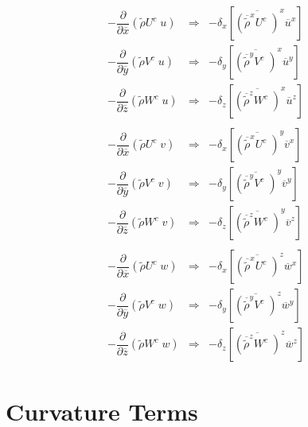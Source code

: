\begin{eqnarray}
- \dfrac{\partial }{\partial \overline{x}} (\tilde{\rho} U^{c} \;   u )
 & \Longrightarrow & - \delta_{x} \left[
\overline{  \left(
\overline{\tilde{\rho}}^{x} U^{c} \;  \right)}^{x}
\overline{  u  }^{x}
 \right]
  \\
  -  \dfrac{\partial }{\partial \overline{y}} (\tilde{\rho} V^{c} \;   u )
 & \Longrightarrow & - \delta_{y} \left[
\overline{  \left(
\overline{ \tilde{\rho}}^{y} V^{c} \; \right)}^{x} \overline{  u }^{y}
  \right]
\\
 -  \dfrac{\partial }{\partial \overline{z}} (\tilde{\rho} W^{c} \;   u )
 & \Longrightarrow & - \delta _{z} \left[ \overline{  \left(
\overline{\tilde{\rho}}^{z} W^{c} \;  \right)}^{x}
 \overline{ u }^{z}
 \right] \\ \nonumber \\
  -  \dfrac{\partial }{\partial \overline{x}} (\tilde{\rho} U^{c} \;   v )
& \Longrightarrow & - \delta_{x} \left[\overline{  \left(
\overline{\tilde{\rho}}^{x} U^{c} \; \right)}^{y} \overline{  v }^{x}
 \right]
\\
- \dfrac{\partial }{\partial \overline{y}} (\tilde{\rho} V^{c} \;   v )
& \Longrightarrow & - \delta_{y} \left[\overline{  \left(
\overline{ \tilde{\rho}}^{y} V^{c} \; \right)}^{y} \overline{   v }^{y}
\right] \\
   - \dfrac{\partial }{\partial \overline{z}} (\tilde{\rho} W^{c} \;   v )
& \Longrightarrow &  - \delta_{z} \left[ \overline{  \left(
\overline{ \tilde{\rho}}^{z} W^{c} \;  \right)}^{y} \overline{  v }^{z}
\right]  \\ \nonumber \\
  -  \dfrac{\partial }{\partial \overline{x}} (\tilde{\rho} U^{c} \;  w)
& \Longrightarrow &  - \delta_{x} \left[\overline{  \left(
\overline{ \tilde{\rho}}^{x}
 U^{c} \; \right)}^{z} \overline{ w}^{x} \right]
   \\
-  \dfrac{\partial }{\partial \overline{y}} (\tilde{\rho} V^{c} \;  w )
& \Longrightarrow &  - \delta_{y} \left[\overline{  \left(
\overline{ \tilde{\rho}}^{y} V^{c} \; \right)}^{z}\overline{
 w }^{y}\right] \\
 -  \dfrac{\partial }{\partial \overline{z}} (\tilde{\rho} W^{c} \;  w)
& \Longrightarrow &  - \delta_{z} \left[ \overline{  \left(
\overline{ \tilde{\rho}}^{z}  W^{c} \;  \right)}^{z}\overline{w}^{z} \right]
 \end{eqnarray}

\section{Curvature Terms}

